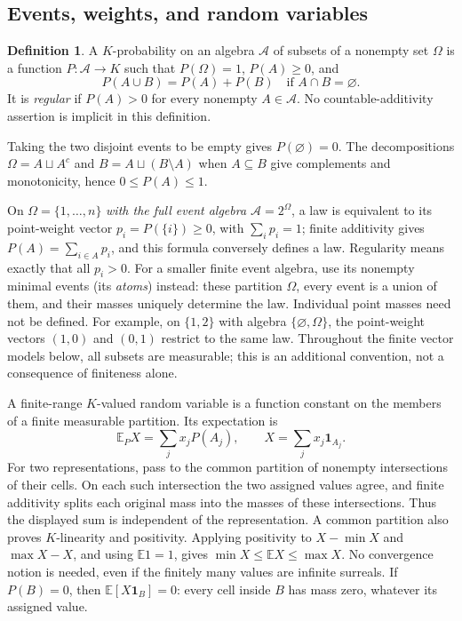 \documentclass[11pt,a4paper]{article}
\numberwithin{equation}{section}
\theoremstyle{definition}
\newtheorem{definition}[theorem]{Definition}
\theoremstyle{remark}
\newcommand{\E}{\mathbb E}
\newcommand{\A}{\mathcal A}
\newcommand{\ind}{\mathbf 1}
\begin{document}
\subsection{Events, weights, and random variables}

\begin{definition}\label{fsp:def:probability}
A $K$-probability on an algebra $\A$ of subsets of a nonempty set $\Omega$
is a function $P:\A\to K$ such that $P(\Omega)=1$, $P(A)\ge0$, and
\begin{equation}
 P(A\cup B)=P(A)+P(B)\quad\text{if }A\cap B=\varnothing.
\end{equation}
It is \emph{regular} if $P(A)>0$ for every nonempty $A\in\A$.
No countable-additivity assertion is implicit in this definition.
\end{definition}

Taking the two disjoint events to be empty gives $P(\varnothing)=0$.
The decompositions $\Omega=A\sqcup A^c$ and
$B=A\sqcup(B\setminus A)$ when $A\subseteq B$ give complements and
monotonicity, hence $0\le P(A)\le1$.

On $\Omega=\{1,\ldots,n\}$ \emph{with the full event algebra
$\A=2^\Omega$}, a law is equivalent to its point-weight vector
$p_i=P(\{i\})\ge0$, with $\sum_i p_i=1$; finite additivity gives
$P(A)=\sum_{i\in A}p_i$, and this formula conversely defines a law.
Regularity means exactly that all $p_i>0$. For a smaller finite event
algebra, use its nonempty minimal events (its \emph{atoms}) instead:
these partition $\Omega$, every event is a union of them, and their masses
uniquely determine the law. Individual point masses need not be defined.
For example, on $\{1,2\}$ with algebra $\{\varnothing,\Omega\}$, the
point-weight vectors $(1,0)$ and $(0,1)$ restrict to the same law.
Throughout the finite vector models below, all subsets are measurable;
this is an additional convention, not a consequence of finiteness alone.

A finite-range $K$-valued random variable is a function constant on the
members of a finite measurable partition. Its expectation is
\begin{equation}\label{fsp:eq:expectation}
 \E_P X=\sum_j x_jP(A_j),\qquad X=\sum_jx_j\ind_{A_j}.
\end{equation}
For two representations, pass to the common partition of nonempty
intersections of their cells. On each such intersection the two assigned
values agree, and finite additivity splits each original mass into the
masses of these intersections. Thus the displayed sum is independent of
the representation. A common partition also proves $K$-linearity and
positivity. Applying positivity to $X-\min X$ and $\max X-X$, and using
$\E1=1$, gives $\min X\le\E X\le\max X$.
No convergence notion is needed, even if the finitely many values are
infinite surreals. If $P(B)=0$, then $\E[X\ind_B]=0$: every cell inside
$B$ has mass zero, whatever its assigned value.
\end{document}
